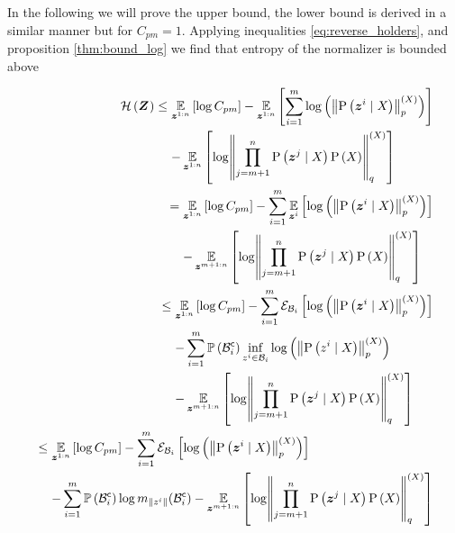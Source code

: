 \begin{proofE}
	In the following we will prove the upper bound, the lower bound is derived in a similar manner but for $C_{pm}=1$. Applying inequalities \eqref{eq:reverse_holders}, and proposition \eqref{thm:bound_log} we find that entropy of the normalizer is bounded above
	\begin{small}
		\begin{align}
			\begin{split}
				\entropy{\observationsRV{}} & \leq\expectation{\log C_{pm}}{\observationRV{}{1:n}}
				-\expectation{\sum_{i=1}^{m}\log\left(\pnorm{\probcond{\observationRV{}{i}}{\states{}}}{p}{\states{}}\right)}{\observationRV{}{1:n}}\\
				&\phantomeq-\expectation{\log\pnorm{\prod_{j=m+1}^n\probcond{\observationRV{}{j}}{\states{}}\prob{\states{}}}{q}{\states{}}}{\observationRV{}{1:n}}
			\end{split}\\
			\begin{split}
				& =\expectation{\log C_{pm}}{\observationRV{}{1:n}}
				-\sum_{i=1}^{m}\expectation{\log\left(\pnorm{\probcond{\observationRV{}{i}}{\states{}}}{p}{\states{}}\right)}{\observationRV{}{i}}\\
				&\phantomeq-\expectation{\log\pnorm{\prod_{j=m+1}^n\probcond{\observationRV{}{j}}{\states{}}\prob{\states{}}}{q}{\states{}}}{\observationRV{}{m+1:n}}
			\end{split}\\
			\begin{split}
				& \leq\expectation{\log C_{pm}}{\observationRV{}{1:n}}
				-\sum_{i=1}^{m}\partialexpectation{\log\left(\pnorm{\probcond{\observationRV{}{i}}{\states{}}}{p}{\states{}}\right)}{\subSpace_i}\\
				&\phantomeq-\sum_{i=1}^{m}\measure{\stcompI{\subSpace}{i}}\inf_{\observation{}{i}\in\subSpace_i}\log\left(\pnorm{\probcond{\observation{}{i}}{\states{}}}{p}{\states{}}\right) \\
				&\phantomeq-\expectation{\log\pnorm{\prod_{j=m+1}^n\probcond{\observationRV{}{j}}{\states{}}\prob{\states{}}}{q}{\states{}}}{\observationRV{}{m+1:n}}
			\end{split} \\
			\begin{split}
				& \leq\expectation{\log C_{pm}}{\observationRV{}{1:n}}-\sum_{i=1}^{m}\partialexpectation{\log\left(\pnorm{\probcond{\observationRV{}{i}}{\states{}}}{p}{\states{}}\right)}{\subSpace_i}\\
				& \phantomeq-\sum_{i=1}^{m}\measure{\stcompI{\subSpace}{i}}\log m_{\norm{\observation{}{i}}}(\stcompI{\subSpace}{i})-\expectation{\log\pnorm{\prod_{j=m+1}^n\probcond{\observationRV{}{j}}{\states{}}\prob{\states{}}}{q}{\states{}}}{\observationRV{}{m+1:n}}

\end{split}
\end{align}
\end{small}
\end{proofE}
